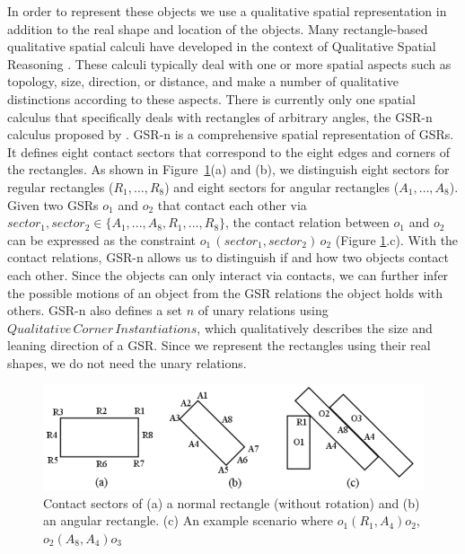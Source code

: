 \documentclass[letterpaper]{article}
\begin{document}
In order to represent these objects we use a qualitative spatial representation in addition to the real shape and location of the objects. Many rectangle-based qualitative spatial calculi \cite{balbiani1998model,cohn2012thinking,sokeh2013efficient} have developed in the context of Qualitative Spatial Reasoning \cite{cohn2008qualitative}. These calculi typically deal with one or more spatial aspects such as topology, size, direction, or distance, and make a number of qualitative distinctions according to these aspects. There is currently only one spatial calculus that specifically deals with rectangles of arbitrary angles, the GSR-n calculus proposed by \cite{Ge2013}. GSR-n is a comprehensive spatial representation of GSRs. It defines eight contact sectors that correspond to the eight edges and corners of the rectangles. As shown in Figure~\ref{GSR}(a) and (b), we distinguish eight sectors for regular rectangles ($R_1,\ldots,R_8$) and eight sectors for angular rectangles ($A_1,\ldots,A_8$). Given two GSRs $o_1$ and $o_2$ that contact each other via $sector_1, sector_2 \in \{A_1, ..., A_8, R_1, ..., R_8\}$, the contact relation between $o_1$ and $o_2$ can be expressed as the constraint $o_1 \, (sector_1, sector_2) \, o_2$ (Figure \ref{GSR}.c). With the contact relations, GSR-n allows us to distinguish if and how two objects contact each other. Since the objects can only interact via contacts, we can further infer the possible motions of an object from the GSR relations the object holds with others. GSR-n also defines a set $n$ of unary relations using  $Qualitative\,Corner\,Instantiations$, which qualitatively describes the size and leaning direction of a GSR. Since we represent the rectangles using their real shapes, we do not need the unary relations. 
\begin{figure}[h!]
\centering\includegraphics[scale=0.35]{GSR.png}\caption{Contact sectors of (a) a normal rectangle (without rotation) and (b) an angular rectangle. (c) An example scenario where $o_1 (R_1, A_4) o_2$, $o_2 (A_8, A_4) o_3$}
\label{GSR}
\vspace{-3mm}
\end{figure}
\end{document}
